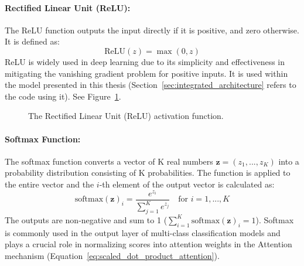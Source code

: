 \begin{appendices}
  \paragraph{Rectified Linear Unit (ReLU):}
  The ReLU function outputs the input directly if it is positive, and zero otherwise. It is defined as:
  \begin{equation}
    \text{ReLU}(z) = \max(0, z)
  \end{equation}
  ReLU is widely used in deep learning due to its simplicity and effectiveness in mitigating the vanishing gradient problem for positive inputs. It is used within the model presented in this thesis (Section~\ref{sec:integrated_architecture} refers to the code using it). See Figure~\ref{fig:relu_plot}.

  \begin{figure}[htbp]
    \centering
    \caption{The Rectified Linear Unit (ReLU) activation function.}
    \label{fig:relu_plot}
  \end{figure}


  \paragraph{Softmax Function:}
  The softmax function converts a vector of K real numbers \( \bm{z} = (z_1, ..., z_K) \) into a probability distribution consisting of K probabilities. The function is applied to the entire vector and the \( i \)-th element of the output vector is calculated as:
  \begin{equation}
    \text{softmax}(\bm{z})_i = \frac{e^{z_i}}{\sum_{j=1}^K e^{z_j}} \quad \text{for } i = 1, ..., K
  \end{equation}
  The outputs are non-negative and sum to 1 (\( \sum_{i=1}^K \text{softmax}(\bm{z})_i = 1 \)). Softmax is commonly used in the output layer of multi-class classification models and plays a crucial role in normalizing scores into attention weights in the Attention mechanism (Equation~\ref{eq:scaled_dot_product_attention}).


\end{appendices}
